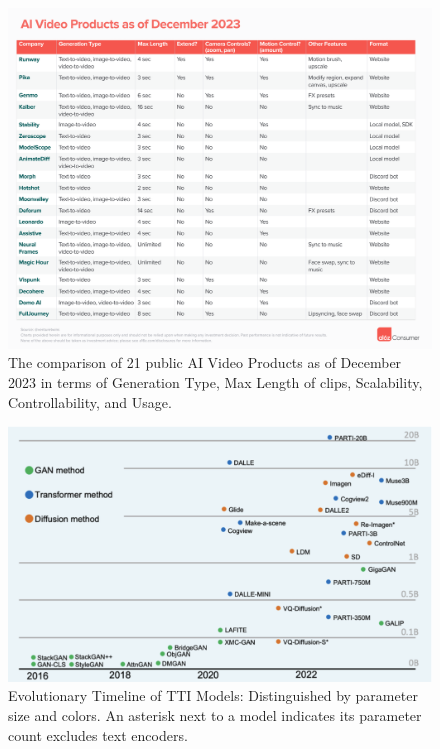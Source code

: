 \documentclass[11pt,a4paper,oneside]{report}
\begin{document}
\begin{figure}[htbp]
  \centering
  \includegraphics[width=\textwidth]{products.png}
  \caption{The comparison of 21 public AI Video Products as of December 2023 in terms of Generation Type, Max Length of clips, Scalability, Controllability, and Usage. \cite{a16zAI2023}}
\end{figure}

\begin{figure}[htbp]
  \centering
  \includegraphics[width=\textwidth]{models.png}
  \caption{Evolutionary Timeline of TTI Models: Distinguished by parameter size and colors. An asterisk next to a model indicates its parameter count excludes text encoders. \cite{bie2023renaissance}}
\end{figure}
\end{document}
